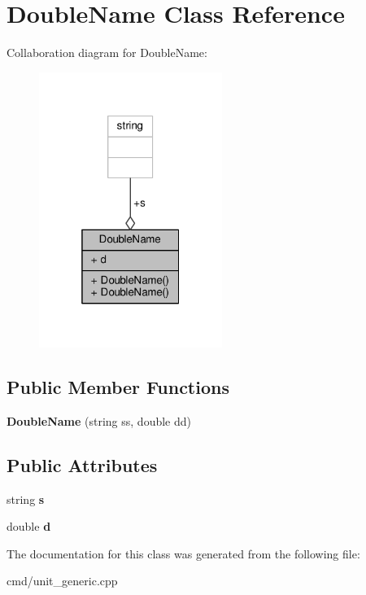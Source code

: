 \hypertarget{classDoubleName}{}\section{Double\+Name Class Reference}
\label{classDoubleName}


Collaboration diagram for Double\+Name\+:
\nopagebreak
\begin{figure}[H]
\begin{center}
\leavevmode
\includegraphics[width=169pt]{d7/d7b/classDoubleName__coll__graph}
\end{center}
\end{figure}
\subsection*{Public Member Functions}
\begin{DoxyCompactItemize}
\item 
{\bfseries Double\+Name} (string ss, double dd)\hypertarget{classDoubleName_a6b51f573c38295a8e13b60a6825fb33f}{}\label{classDoubleName_a6b51f573c38295a8e13b60a6825fb33f}

\end{DoxyCompactItemize}
\subsection*{Public Attributes}
\begin{DoxyCompactItemize}
\item 
string {\bfseries s}\hypertarget{classDoubleName_a858da4c105fc2be3112dfe48f4eefda2}{}\label{classDoubleName_a858da4c105fc2be3112dfe48f4eefda2}

\item 
double {\bfseries d}\hypertarget{classDoubleName_a0d11b50439bc8fcef11da550bc168b11}{}\label{classDoubleName_a0d11b50439bc8fcef11da550bc168b11}

\end{DoxyCompactItemize}


The documentation for this class was generated from the following file\+:\begin{DoxyCompactItemize}
\item 
cmd/unit\+\_\+generic.\+cpp\end{DoxyCompactItemize}
